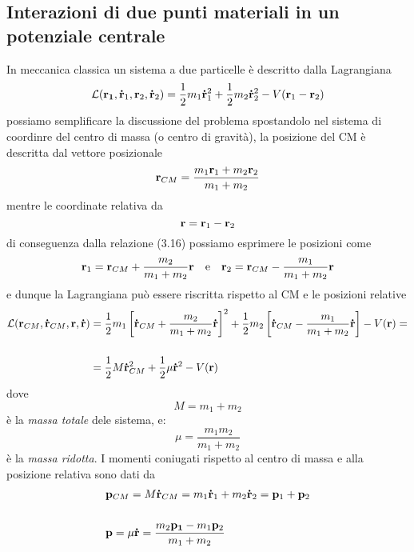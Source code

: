 \subsection{Interazioni di due punti materiali in un potenziale centrale }
In meccanica classica un sistema a due particelle \`e descritto dalla Lagrangiana
\begin{equation*}
	\mathcal{L}(\bold{r_1},\bold{\dot{r}}_1,\bold{r}_2,\bold{\dot{r}}_2)  = \frac{1}{2}m_1\bold{\dot{r}}^2_1 + \frac{1}{2}m_2\bold{\dot{r}}_2^2 - V(\bold{r}_1 - \bold{r}_2)
\end{equation*}
possiamo semplificare la discussione del problema spostandolo nel sistema di coordinre del centro di massa (o centro di gravit\`a), la posizione del CM \`e descritta dal vettore posizionale 
\begin{equation}
	\bold{r}_{CM} = \frac{m_1\bold{r}_1 + m_2\bold{r}_2}{m_1+m_2}
\end{equation}
mentre le coordinate relativa da 
\begin{equation*}
	\bold{r} = \bold{r}_1 - \bold{r}_2
\end{equation*}
di conseguenza dalla relazione (3.16) possiamo esprimere le posizioni come
\begin{equation*}
	\bold{r}_1 = \bold{r}_{CM} + \frac{m_2}{m_1+m_2}\bold{r} \quad \text{e} \quad \bold{r}_2 = \bold{r}_{CM} - \frac{m_1}{m_1 + m_2}\bold{r}
\end{equation*}
e dunque la Lagrangiana pu\`o essere riscritta rispetto al CM e le posizioni relative 
\begin{align*}
	\mathcal{L}(\bold{r}_{CM},\bold{\dot{r}}_{CM},\bold{r},\bold{\dot{r}}) & = \frac{1}{2}m_1 \left [ \bold{\dot{r}}_{CM} + \frac{m_2}{m_1+m_2}\bold{\dot{r}}\right]^2 + \frac{1}{2}m_2 \left [ \bold{\dot{r}}_{CM} - \frac{m_1}{m_1+m_2}\bold{\dot{r}}\right] - V(\bold{r}) = \\[0.5cm]
	& = \frac{1}{2}M \bold{\dot{r}}_{CM}^2 + \frac{1}{2}\mu \bold{\dot{r}}^2 - V(\bold{r})
\end{align*}
dove 
\begin{equation*}
	M = m_1 + m_2
\end{equation*}
\`e la \textit{massa totale} dele sistema, e:
\begin{equation*}
	\mu = \frac{m_1m_2}{m_1+m_2}
\end{equation*}
\`e la \textit{massa ridotta}. I momenti coniugati rispetto al centro di massa e alla posizione relativa sono dati da
\begin{align*}
	& \bold{p}_{CM} = M \bold{\dot{r}}_{CM} = m_1\bold{\dot{r}}_1 + m_2 \bold{\dot{r}}_2 = \bold{p}_1 + \bold{p}_2 \\[0.5cm] 
	& \bold{p} = \mu \bold{\dot{r}} = \frac{m_2\bold{p_1} - m_1 \bold{p}_{2}}{m_1+m_2}
\end{align*}
